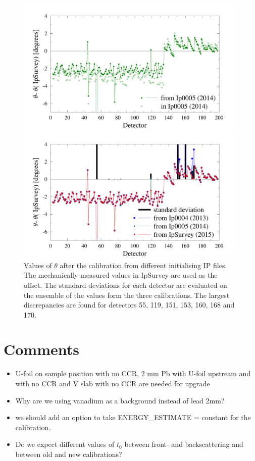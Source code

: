 \documentclass[11pt,a4paper,oneside]{article}
\begin{document}
\begin{figure}
\centering
\includegraphics[width=\textwidth]{img/theta_bis}

\includegraphics[width=\textwidth]{img/theta}
\caption{Values of $\theta$ after the calibration from different initialising IP files. The mechanically-measured values in IpSurvey are used as the offset. The standard deviations for each detector are evaluated on the ensemble of the values form the three calibrations. The largest discrepancies are found for detectors 55, 119, 151, 153, 160, 168 and 170.}
\label{theta}
\end{figure}



\section{Comments}

\begin{itemize}
\item U-foil on sample position with no CCR, 2 mm Pb with U-foil upstream and with no CCR and V slab with no CCR are needed for upgrade
\item Why are we using vanadium as a background instead of lead 2mm?
\item we should add an option to take ENERGY\_ESTIMATE = constant for the calibration.
\item Do we expect different values of $t_0$ between front- and backscattering and between old and new calibrations?
\end{itemize}
\end{document}
